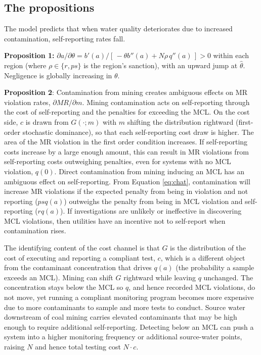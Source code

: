 \documentclass[12pt]{article}
\begin{document}
\subsection{The propositions}

The model predicts that when water quality deteriorates due to increased contamination, self-reporting rates fall.

\textbf{Proposition 1:} $\partial a/\partial\theta = b'(a) / [\,-\theta b''(a) + N\rho\, q''(a)\,] > 0$ within each region (where $\rho \in \{r, ps\}$ is the region's sanction), with an upward jump at $\hat{\theta}$. Negligence is globally increasing in $\theta$.

\textbf{Proposition 2}: Contamination from mining creates ambiguous effects on MR violation rates, $\partial MR/\partial m$.
Mining contamination acts on self-reporting through the cost of self-reporting and the penalties for exceeding the MCL. On the cost side, $c$ is drawn from $G(\cdot;m)$ with $m$ shifting the distribution rightward (first-order stochastic dominance), so that each self-reporting cost draw is higher. The area of the MR violation in the first order condition increases. If self-reporting costs increase by a large enough amount, this can result in MR violations from self-reporting costs outweighing penalties, even for systems with no MCL violation, $q(0)$.
Direct contamination from mining inducing an MCL has an ambiguous effect on self-reporting. From Equation \ref{eq:chat}, contamination will increase MR violations if the expected penalty from being in violation and not reporting ($psq(a)$) outweighs the penalty from being in MCL violation and self-reporting ($rq(a)$). If investigations are unlikely or ineffective in discovering MCL violations, then utilities have an incentive not to self-report when contamination rises.

The identifying content of the cost channel is that $G$ is the distribution of the cost of executing and reporting a compliant test, $c$, which is a different object from the contaminant concentration that drives $q(a)$ (the probability a sample exceeds an MCL). Mining can shift $G$ rightward while leaving $q$ unchanged. The concentration stays below the MCL so $q$, and hence recorded MCL violations, do not move, yet running a compliant monitoring program becomes more expensive due to more contaminants to sample and more tests to conduct. Source water downstream of coal mining carries elevated contaminants that may be high enough to require additional self-reporting. Detecting below an MCL can push a system into a higher monitoring frequency or additional source-water points, raising $N$ and hence total testing cost $N\cdot c$.
\end{document}
